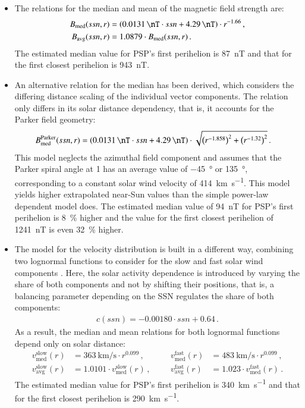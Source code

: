 \begin{itemize}
	\item The relations for the median and mean of the magnetic field strength are:
	\begin{align*}
		B_\text{med}(ssn,r) &= \left(\SI{0.0131}{\nT} \cdot ssn + \SI{4.29}{\nT}\right) \cdot r^{-1.66}	\,,\\
		B_\text{avg}(ssn,r) &= 1.0879 \cdot B_\text{med}(ssn,r)	\,.
	\end{align*}
	 The estimated median value for PSP's first perihelion is \SI{87}{\nano\tesla} and that for the first closest perihelion is \SI{943}{\nano\tesla}.
	
	\item An alternative relation for the median has been derived, which considers the differing distance scaling of the individual vector components. The relation only differs in its solar distance dependency, that is, it accounts for the Parker field geometry:
	\begin{align*}
		B^\text{Parker}_\text{med}(ssn,r) &= \left(\SI{0.0131}{\nT} \cdot ssn + \SI{4.29}{\nT}\right) \cdot \sqrt{\left(r^{-1.858}\right)^2 + \left(r^{-1.32}\right)^2}	\,.
	\end{align*}
	This model neglects the azimuthal field component and assumes that the Parker spiral angle at \SI{1}{\au} has an average value of \SI{-45}{\degree} or \SI{135}{\degree}, corresponding to a constant solar wind velocity of \SI{414}{\km\per\s}.
	This model yields higher extrapolated near-Sun values than the simple power-law dependent model does. The estimated median value of \SI{94}{\nano\tesla} for PSP's first perihelion is \SI{8}{\%} higher and the value for the first closest perihelion of \SI{1241}{\nano\tesla} is even \SI{32}{\%} higher.
	
	\item The model for the velocity distribution is built in a different way, combining two lognormal functions to consider for the slow and fast solar wind components \citep[see the Equation~(5) in][]{Venzmer2018}. Here, the solar activity dependence is introduced by varying the share of both components and not by shifting their positions, that is, a balancing parameter depending on the SSN regulates the share of both components:
	\begin{align*}
		c(ssn) = -0.00180 \cdot ssn + 0.64	\,.
	\end{align*}
	As a result, the median and mean relations for both lognormal functions depend only on solar distance:
	\begin{align*}
		v_\text{med}^\text{slow}(r) &= \SI{363}{\km\per\s} \cdot r^{0.099}	\,,&    &       &v_\text{med}^\text{fast}(r) &= \SI{483}{\km\per\s} \cdot r^{0.099}	\,,\\
		v_\text{avg}^\text{slow}(r) &= 1.0101 \cdot v_\text{med}^\text{slow}(r)	\,,&    &       &v_\text{avg}^\text{fast}(r) &= 1.023 \cdot v_\text{med}^\text{fast}(r)	\,.
	\end{align*}
	 The estimated median value for PSP's first perihelion is \SI{340}{\km\per\s} and that for the first closest perihelion is \SI{290}{\km\per\s}.
	

\end{itemize}
